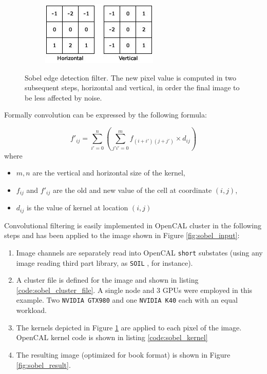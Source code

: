 {\begin{figure}[!htb]
	\endminipage\hfill
	\begin{subfigure}{1.0\textwidth}
		\includegraphics[width=\linewidth]{./images/opencal/conv-sobel}	
	\end{subfigure}
	\endminipage\hfill
	\caption{Sobel edge detection filter. The new pixel value is computed in two subsequent steps, horizontal and vertical, in order the final image to be less affected by noise.}
	\label{fig:sobel}
\end{figure}

Formally convolution can be expressed by the following formula:

\begin{equation*}
   f'_{ij} = \sum_{i'=0}^n (\sum_{j'i'=0}^m f_{(i+i')(j+j')}\times d_{ij})
\end{equation*}
where 
\begin{itemize}
	\item $m,n$ are the  vertical and horizontal size of the kernel,
	\item $f_{ij}$ and $f'_{ij}$ are the old and new value of the cell at coordinate $(i,j)$,
	\item $d_{ij}$ is the value of kernel at location $(i,j)$ 
\end{itemize}


Convolutional filtering is easily implemented in OpenCAL cluster in the following steps and has been applied to the image shown in Figure \ref{fig:sobel_input}:
\begin{enumerate}
    \item Image channels are separately read into OpenCAL \texttt{short} substates (using any image reading third part library, as \texttt{SOIL} \cite{SOIL}, for instance).
    \item A cluster file is defined for the image and shown in listing \ref{code:sobel_cluster_file}. A single node and 3 GPUs were employed in this example. Two \texttt{NVIDIA GTX980} and one \texttt{NVIDIA K40} each with an equal workload.
    \item The kernels depicted in Figure \ref{fig:sobel} are applied to each pixel of the image. OpenCAL kernel code is shown in listing \ref{code:sobel_kernel} 
    \item The resulting image (optimized for book format) is shown in Figure \ref{fig:sobel_result}.
\end{enumerate}

}
